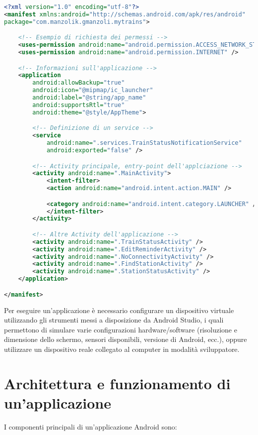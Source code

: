 \begin{lstlisting}[language=XML, caption=Esempiod di \texttt{AndroidManifest.xml}]
<?xml version="1.0" encoding="utf-8"?>
<manifest xmlns:android="http://schemas.android.com/apk/res/android"
package="com.manzolik.gmanzoli.mytrains">

	<!-- Esempio di richiesta dei permessi -->
	<uses-permission android:name="android.permission.ACCESS_NETWORK_STATE" />
	<uses-permission android:name="android.permission.INTERNET" />

	<!-- Informazioni sull'applicazione -->
	<application
		android:allowBackup="true"
		android:icon="@mipmap/ic_launcher"
		android:label="@string/app_name"
		android:supportsRtl="true"
		android:theme="@style/AppTheme">

		<!-- Definizione di un service -->
		<service
			android:name=".services.TrainStatusNotificationService"
			android:exported="false" />

		<!-- Activity principale, entry-point dell'applciazione -->
		<activity android:name=".MainActivity">
			<intent-filter>
			<action android:name="android.intent.action.MAIN" />

			<category android:name="android.intent.category.LAUNCHER" />
			</intent-filter>
		</activity>

		<!-- Altre Activity dell'applicazione -->
		<activity android:name=".TrainStatusActivity" />
		<activity android:name=".EditReminderActivity" />
		<activity android:name=".NoConnectivityActivity" />
		<activity android:name=".FindStationActivity" />
		<activity android:name=".StationStatusActivity" />
	</application>

</manifest>
\end{lstlisting}

Per eseguire un'applicazione è necessario configurare un dispositivo
virtuale utilizzando gli strumenti messi a disposizione da Android
Studio, i quali permettono di simulare varie configurazioni
hardware/software (risoluzione e dimensione dello schermo, sensori
disponibili, versione di Android, ecc.), oppure utilizzare un
dispositivo reale collegato al computer in modalità sviluppatore.

\section{Architettura e funzionamento di un'applicazione}\label{architettura-e-funzionamento-di-unapplicazione}

I componenti principali di un'applicazione Android sono:


